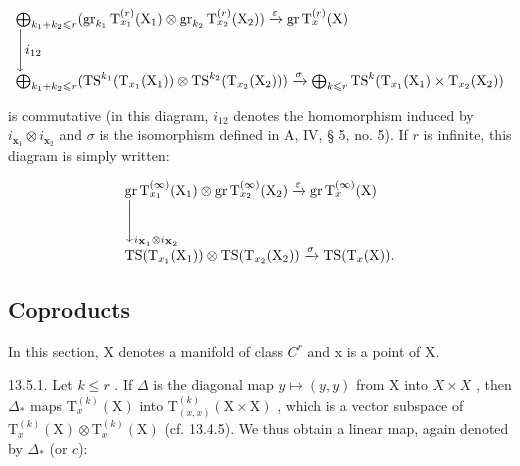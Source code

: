 \[
\begin{array}{l} \bigoplus_ {k _ {1} + k _ {2} \leqslant r} (\operatorname{gr} _ {k _ {1}} \mathrm{T} _ {x _ {1}} ^ {(r)} (\mathrm{X} _ {1}) \otimes \operatorname{gr} _ {k _ {2}} \mathrm{T} _ {x _ {2}} ^ {(r)} (\mathrm{X} _ {2})) \xrightarrow {\varepsilon} \operatorname{gr} \mathrm{T} _ {x} ^ {(r)} (\mathrm{X}) \\ \Biggl \downarrow i _ {1 2} \\ \bigoplus_ {k _ {1} + k _ {2} \leqslant r} (\mathrm{TS} ^ {k _ {1}} (\mathrm{T} _ {x _ {1}} (\mathrm{X} _ {1})) \otimes \mathrm{TS} ^ {k _ {2}} (\mathrm{T} _ {x _ {2}} (\mathrm{X} _ {2}))) \xrightarrow {\sigma} \bigoplus_ {k \leqslant r} \mathrm{TS} ^ {k} (\mathrm{T} _ {x _ {1}} (\mathrm{X} _ {1}) \times \mathrm{T} _ {x _ {2}} (\mathrm{X} _ {2})) \end{array}
\]

is commutative (in this diagram, \(i_{12}\) denotes the homomorphism induced by \(i_{\mathbf{x}_1} \otimes i_{\mathbf{x}_2}\) and \(\sigma\) is the isomorphism defined in A, IV, § 5, no. 5). If \(r\) is infinite, this diagram is simply written:

\[
\begin{array}{l} \operatorname{gr} \mathrm{T} _ {x _ {1}} ^ {(\infty)} (\mathrm{X} _ {1}) \otimes \operatorname{gr} \mathrm{T} _ {x _ {2}} ^ {(\infty)} (\mathrm{X} _ {2}) \xrightarrow {\varepsilon} \operatorname{gr} \mathrm{T} _ {x} ^ {(\infty)} (\mathrm{X}) \\ \Biggl \downarrow_ {i _ {\mathbf {X} _ {1}} \otimes i _ {\mathbf {X} _ {2}}} \\ \operatorname{TS} (\mathrm{T} _ {x _ {1}} (\mathrm{X} _ {1})) \otimes \operatorname{TS} (\mathrm{T} _ {x _ {2}} (\mathrm{X} _ {2})) \xrightarrow {\sigma} \operatorname{TS} (\mathrm{T} _ {x} (\mathrm{X})). \end{array}
\]

\subsection{Coproducts}

In this section, X denotes a manifold of class \(C^{r}\) and x is a point of X.

13.5.1. Let \(k \leqslant r\) . If \(\Delta\) is the diagonal map \(y \mapsto (y, y)\) from X into \(X \times X\) , then \(\Delta_*\) maps \(\mathrm{T}_x^{(k)}(\mathrm{X})\) into \(\mathrm{T}_{(x,x)}^{(k)}(\mathrm{X} \times \mathrm{X})\) , which is a vector subspace of \(\mathrm{T}_{x}^{(k)}(\mathrm{X})\otimes\mathrm{T}_{x}^{(k)}(\mathrm{X})\) (cf. 13.4.5). We thus obtain a linear map, again denoted by \(\Delta_{*}\) (or \(c\)):

